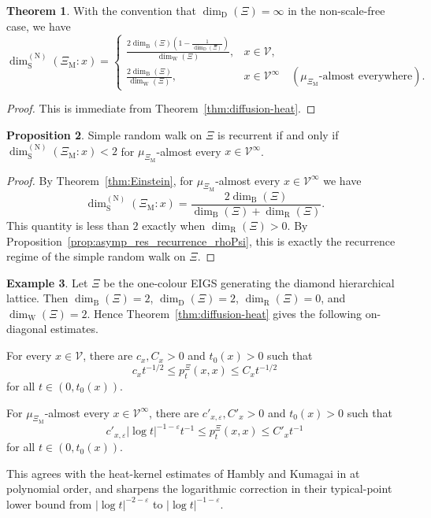 \documentclass{article}
\theoremstyle{plain}
\theoremstyle{definition}
\newtheorem{theorem}{Theorem}[section]
\newtheorem{example}[theorem]{Example}
\newtheorem{proposition}[theorem]{Proposition}
\newcommand{\dimbox}{\dim_\mathrm{B}}
\newcommand{\dimdeg}{\dim_\mathrm{D}}
\newcommand{\dimwalk}{\dim_\mathrm{W}}
\newcommand{\dimresis}{\dim_\mathrm{R}}
\newcommand{\dimspec}{\dim_\mathrm{S}}
\begin{document}
\begin{theorem}\label{thm:diffusion-spectral}
With the convention that $\dimdeg(\Xi)=\infty$ in the non-scale-free case, we have
\[
\dimspec^{(\mathrm N)}(\Xi_{\mathrm M}:x)
=
\begin{cases}
\displaystyle
\frac{2\dimbox(\Xi)\left(1-\frac{1}{\dimdeg(\Xi)}\right)}{\dimwalk(\Xi)},
&
x \in \mathscr V,
\\[2mm]
\displaystyle
\frac{2\dimbox(\Xi)}{\dimwalk(\Xi)},
&
x \in \mathscr V^\infty
\quad
(\mu_{\Xi_{\mathrm M}}\text{-almost everywhere}).
\end{cases}
\]
\end{theorem}

\begin{proof}
This is immediate from Theorem~\ref{thm:diffusion-heat}.
\end{proof}

\begin{proposition}\label{prop:final_recurrent}
Simple random walk on $\Xi$ is recurrent if and only if $\dimspec^{(\mathrm N)}(\Xi_{\mathrm M}:x)<2$ for $\mu_{\Xi_{\mathrm M}}$-almost every $x\in \mathscr V^\infty$.
\end{proposition}

\begin{proof}
By Theorem~\ref{thm:Einstein}, for $\mu_{\Xi_{\mathrm M}}$-almost every $x\in \mathscr V^\infty$ we have
\[
\dimspec^{(\mathrm N)}(\Xi_{\mathrm M}:x)
=
\frac{2\dimbox(\Xi)}{\dimbox(\Xi)+\dimresis(\Xi)}.
\]
This quantity is less than $2$ exactly when $\dimresis(\Xi)>0$.
By Proposition~\ref{prop:asymp_res_recurrence_rhoPsi}, this is exactly the recurrence regime of the simple random walk on $\Xi$.
\end{proof}

\begin{example}
Let $\Xi$ be the one-colour EIGS generating the diamond hierarchical lattice.
Then $\dimbox(\Xi)=2$, $\dimdeg(\Xi)=2$, $\dimresis(\Xi)=0$, and $\dimwalk(\Xi)=2$.
Hence Theorem~\ref{thm:diffusion-heat} gives the following on-diagonal estimates.

For every $x\in\mathscr V$, there are $c_x,C_x>0$ and $t_0(x)>0$ such that
\[
c_x t^{-1/2}\le p_t^\Xi(x,x)\le C_x t^{-1/2}
\]
for all $t\in(0,t_0(x))$.

For $\mu_{\Xi_{\mathrm M}}$-almost every $x\in\mathscr V^\infty$, there are $c'_{x,\varepsilon},C'_x>0$ and $t_0(x)>0$ such that
\[
c'_{x,\varepsilon}|\log t|^{-1-\varepsilon}t^{-1}
\le
p_t^\Xi(x,x)
\le
C'_x t^{-1}
\]
for all $t\in(0,t_0(x))$.

This agrees with the heat-kernel estimates of Hambly and Kumagai in \cite{hambly2010diffusion} at polynomial order, and sharpens the logarithmic correction in their typical-point lower bound from $|\log t|^{-2-\varepsilon}$ to $|\log t|^{-1-\varepsilon}$.
\end{example}
\end{document}
